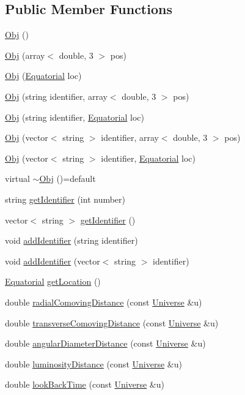 \subsection*{Public Member Functions}
\begin{DoxyCompactItemize}
\item 
\hyperlink{class_obj_ae6d85a21719815c7bbb9cd68d609e0a0}{Obj} ()
\item 
\hyperlink{class_obj_a36ce6f3ebbb04e1eaa616a68adca59fe}{Obj} (array$<$ double, 3 $>$ pos)
\item 
\hyperlink{class_obj_a376349e92c61e68b131fe662cb781a16}{Obj} (\hyperlink{class_equatorial}{Equatorial} loc)
\item 
\hyperlink{class_obj_a4fdf8a5a6959362fc757c90d5b5edcd0}{Obj} (string identifier, array$<$ double, 3 $>$ pos)
\item 
\hyperlink{class_obj_a49b473cf45363f170001c80ac66ace62}{Obj} (string identifier, \hyperlink{class_equatorial}{Equatorial} loc)
\item 
\hyperlink{class_obj_a106e577728a05a08d41ada3c286bb613}{Obj} (vector$<$ string $>$ identifier, array$<$ double, 3 $>$ pos)
\item 
\hyperlink{class_obj_adaf14990af8049cccb1314e425b7615a}{Obj} (vector$<$ string $>$ identifier, \hyperlink{class_equatorial}{Equatorial} loc)
\item 
virtual \hyperlink{class_obj_a1331b88810f8f346b820cb855955feea}{$\sim$\-Obj} ()=default
\item 
string \hyperlink{class_obj_ab8db1493558965a3d895a486d641716e}{get\-Identifier} (int number)
\item 
vector$<$ string $>$ \hyperlink{class_obj_a2eeea0eace0600a188146e0021503cc7}{get\-Identifier} ()
\item 
void \hyperlink{class_obj_afb9cdab9ce6d9b5ae6942465b91f14d1}{add\-Identifier} (string identifier)
\item 
void \hyperlink{class_obj_af54187bd0affc6d46fdb85af1d35de8a}{add\-Identifier} (vector$<$ string $>$ identifier)
\item 
\hyperlink{class_equatorial}{Equatorial} \hyperlink{class_obj_a37de1c5bfaa5b641bf6f093a809cc8d0}{get\-Location} ()
\item 
double \hyperlink{class_obj_ab4a4130741f5641d97ca33f4468dc9a3}{radial\-Comoving\-Distance} (const \hyperlink{class_universe}{Universe} \&u)
\item 
double \hyperlink{class_obj_a75e3651dda7a1262c4f7c6ff431bb9c8}{transverse\-Comoving\-Distance} (const \hyperlink{class_universe}{Universe} \&u)
\item 
double \hyperlink{class_obj_a4e0add44503b0efdc90046f8eabd1d6d}{angular\-Diameter\-Distance} (const \hyperlink{class_universe}{Universe} \&u)
\item 
double \hyperlink{class_obj_ae168d94748733f995bdfeb8440d332a3}{luminosity\-Distance} (const \hyperlink{class_universe}{Universe} \&u)
\item 
double \hyperlink{class_obj_a6107516e388eb66505d684f977dceac0}{look\-Back\-Time} (const \hyperlink{class_universe}{Universe} \&u)
\end{DoxyCompactItemize}

